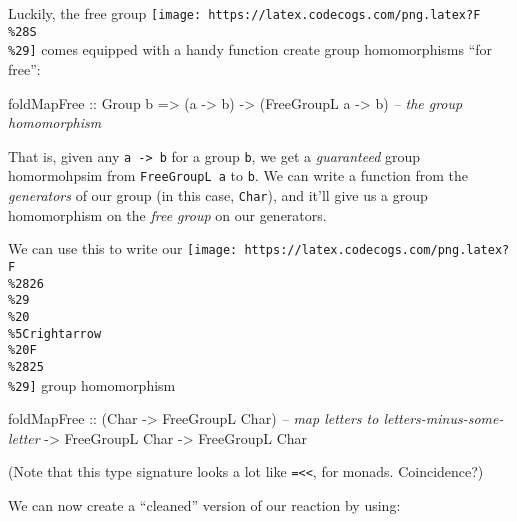 \documentclass[]{article}
\newenvironment{Shaded}{}{}
\newcommand{\CommentTok}[1]{\textcolor[rgb]{0.38,0.63,0.69}{\textit{#1}}}
\newcommand{\DataTypeTok}[1]{\textcolor[rgb]{0.56,0.13,0.00}{#1}}
\newcommand{\FunctionTok}[1]{\textcolor[rgb]{0.02,0.16,0.49}{#1}}
\newcommand{\KeywordTok}[1]{\textcolor[rgb]{0.00,0.44,0.13}{\textbf{#1}}}
\newcommand{\NormalTok}[1]{#1}
\newcommand{\OtherTok}[1]{\textcolor[rgb]{0.00,0.44,0.13}{#1}}
\begin{document}
Luckily, the free group
\texttt{[image: https://latex.codecogs.com/png.latex?F\\\%28S\\\%29]} comes equipped
with a handy function create group homomorphisms ``for free'':

\begin{Shaded}
\begin{Highlighting}[]
\NormalTok{foldMapFree}
\OtherTok{    ::} \DataTypeTok{Group}\NormalTok{ b}
    \OtherTok{=>}\NormalTok{ (a }\OtherTok{->}\NormalTok{ b)}
    \OtherTok{->}\NormalTok{ (}\DataTypeTok{FreeGroupL}\NormalTok{ a }\OtherTok{->}\NormalTok{ b)     }\CommentTok{-- the group homomorphism}
\end{Highlighting}
\end{Shaded}

That is, given any \texttt{a\ -\textgreater{}\ b} for a group \texttt{b}, we get
a \emph{guaranteed} group homormohpsim from \texttt{FreeGroupL\ a} to
\texttt{b}. We can write a function from the \emph{generators} of our group (in
this case, \texttt{Char}), and it'll give us a group homomorphism on the
\emph{free group} on our generators.

We can use this to write our
\texttt{[image: https://latex.codecogs.com/png.latex?F\\\%2826\\\%29\\\%20\\\%5Crightarrow\\\%20F\\\%2825\\\%29]}
group homomorphism

\begin{Shaded}
\begin{Highlighting}[]
\NormalTok{foldMapFree}
\OtherTok{    ::}\NormalTok{ (}\DataTypeTok{Char} \OtherTok{->} \DataTypeTok{FreeGroupL} \DataTypeTok{Char}\NormalTok{)  }\CommentTok{-- map letters to letters-minus-some-letter}
    \OtherTok{->} \DataTypeTok{FreeGroupL} \DataTypeTok{Char}
    \OtherTok{->} \DataTypeTok{FreeGroupL} \DataTypeTok{Char}
\end{Highlighting}
\end{Shaded}

(Note that this type signature looks a lot like
\texttt{=\textless{}\textless{}}, for monads. Coincidence?)

We can now create a ``cleaned'' version of our reaction by using:

\begin{Shaded}
\end{Shaded}
\end{document}
